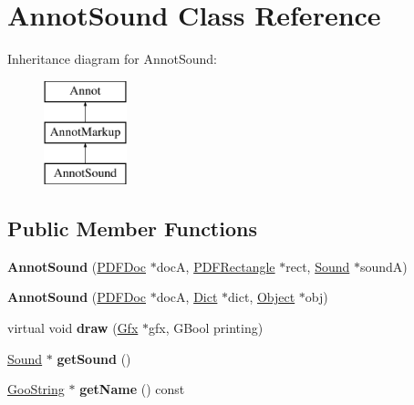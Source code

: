 \hypertarget{class_annot_sound}{}\section{Annot\+Sound Class Reference}
\label{class_annot_sound}
Inheritance diagram for Annot\+Sound\+:\begin{figure}[H]
\begin{center}
\leavevmode
\includegraphics[height=3.000000cm]{class_annot_sound}
\end{center}
\end{figure}
\subsection*{Public Member Functions}
\begin{DoxyCompactItemize}
\item 
\mbox{\label{class_annot_sound_a50e8806b52731bbf158baab56b20a110}} 
{\bfseries Annot\+Sound} (\hyperlink{class_p_d_f_doc}{P\+D\+F\+Doc} $\ast$docA, \hyperlink{class_p_d_f_rectangle}{P\+D\+F\+Rectangle} $\ast$rect, \hyperlink{class_sound}{Sound} $\ast$soundA)
\item 
\mbox{\label{class_annot_sound_aaf2901b82ddfce06df8fd29492613caa}} 
{\bfseries Annot\+Sound} (\hyperlink{class_p_d_f_doc}{P\+D\+F\+Doc} $\ast$docA, \hyperlink{class_dict}{Dict} $\ast$dict, \hyperlink{class_object}{Object} $\ast$obj)
\item 
\mbox{\label{class_annot_sound_ae5aec0f4ed5ea995493334f7c05f1e41}} 
virtual void {\bfseries draw} (\hyperlink{class_gfx}{Gfx} $\ast$gfx, G\+Bool printing)
\item 
\mbox{\label{class_annot_sound_a42b289efbf7bf6494526dce737628bba}} 
\hyperlink{class_sound}{Sound} $\ast$ {\bfseries get\+Sound} ()
\item 
\mbox{\label{class_annot_sound_ab63e9b13047a15251f8984c213f46017}} 
\hyperlink{class_goo_string}{Goo\+String} $\ast$ {\bfseries get\+Name} () const
\end{DoxyCompactItemize}
